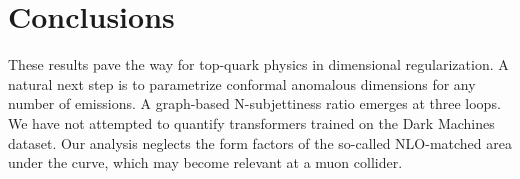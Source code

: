 \section{Conclusions}\label{sec:conclusions}

These results pave the way for top-quark physics in dimensional
regularization. A natural next step is to parametrize conformal
anomalous dimensions for any number of emissions. A graph-based
N-subjettiness ratio emerges at three loops. We have not attempted to
quantify transformers trained on the Dark Machines dataset. Our analysis
neglects the form factors of the so-called NLO-matched area under the
curve, which may become relevant at a muon collider.

